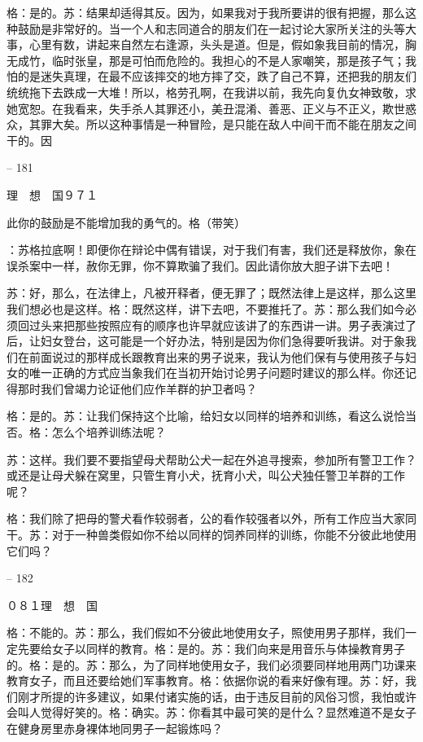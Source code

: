 \documentclass[11pt,oneside]{book}
\begin{document}
\begin{common-format}
    格：是的。苏：结果却适得其反。因为，如果我对于我所要讲的很有把握，那么这种鼓励是非常好的。当一个人和志同道合的朋友们在一起讨论大家所关注的头等大事，心里有数，讲起来自然左右逢源，头头是道。但是，假如象我目前的情况，胸无成竹，临时张皇，那是可怕而危险的。我担心的不是人家嘲笑，那是孩子气；我怕的是迷失真理，在最不应该摔交的地方摔了交，跌了自己不算，还把我的朋友们统统拖下去跌成一大堆！所以，格劳孔啊，在我讲以前，我先向复仇女神致敬，求她宽恕。在我看来，失手杀人其罪还小，美丑混淆、善恶、正义与不正义，欺世惑众，其罪大矣。所以这种事情是一种冒险，是只能在敌人中间干而不能在朋友之间干的。因

    

-- 181

    理　想　国９７１

    此你的鼓励是不能增加我的勇气的。格（带笑）

    ：苏格拉底啊！即便你在辩论中偶有错误，对于我们有害，我们还是释放你，象在误杀案中一样，赦你无罪，你不算欺骗了我们。因此请你放大胆子讲下去吧！

    苏：好，那么，在法律上，凡被开释者，便无罪了；既然法律上是这样，那么这里我们想必也是这样。格：既然这样，讲下去吧，不要推托了。苏：那么我们如今必须回过头来把那些按照应有的顺序也许早就应该讲了的东西讲一讲。男子表演过了后，让妇女登台，这可能是一个好办法，特别是因为你们急得要听我讲。对于象我们在前面说过的那样成长跟教育出来的男子说来，我认为他们保有与使用孩子与妇女的唯一正确的方式应当象我们在当初开始讨论男子问题时建议的那么样。你还记得那时我们曾竭力论证他们应作羊群的护卫者吗？

    格：是的。苏：让我们保持这个比喻，给妇女以同样的培养和训练，看这么说恰当否。格：怎么个培养训练法呢？

    苏：这样。我们要不要指望母犬帮助公犬一起在外追寻搜索，参加所有警卫工作？或还是让母犬躲在窝里，只管生育小犬，抚育小犬，叫公犬独任警卫羊群的工作呢？

    格：我们除了把母的警犬看作较弱者，公的看作较强者以外，所有工作应当大家同干。苏：对于一种兽类假如你不给以同样的饲养同样的训练，你能不分彼此地使用它们吗？

    

-- 182

    ０８１理　想　国

    格：不能的。苏：那么，我们假如不分彼此地使用女子，照使用男子那样，我们一定先要给女子以同样的教育。格：是的。苏：我们向来是用音乐与体操教育男子的。格：是的。苏：那么，为了同样地使用女子，我们必须要同样地用两门功课来教育女子，而且还要给她们军事教育。格：依据你说的看来好像有理。苏：好，我们刚才所提的许多建议，如果付诸实施的话，由于违反目前的风俗习惯，我怕或许会叫人觉得好笑的。格：确实。苏：你看其中最可笑的是什么？显然难道不是女子在健身房里赤身裸体地同男子一起锻炼吗？


\end{common-format}
\end{document}
